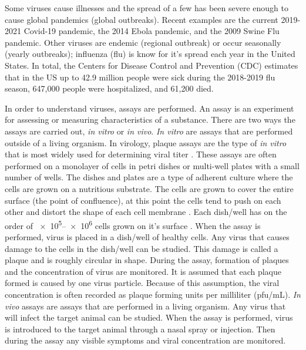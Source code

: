Some viruses cause illnesses and the spread of a few has been severe enough to cause global pandemics (global outbreaks). Recent examples are the current 2019-2021 Covid-19 pandemic, the 2014 Ebola pandemic, and the 2009 Swine Flu pandemic. Other viruses are endemic (regional outbreak) or occur seasonally (yearly outbreaks); influenza (flu) is know for it's spread each year in the United States. In total, the Centers for Disease Control and Prevention (CDC) estimates that in the US up to 42.9 million people were sick during the 2018-2019 flu season, 647,000 people were hospitalized, and 61,200 died. \citep{xu_update_2019}

In order to understand viruses, assays are performed. An assay is an experiment for assessing or measuring characteristics of a substance. There are two ways the assays are carried out, \emph{in vitro} or \emph{in vivo}. \emph{In vitro} are assays that are performed outside of a living organism. In virology, plaque assays are the type of  \emph{in vitro} that is most widely used for determining viral titer \citep{Kumar}.  These assays are often performed on a monolayer of cells in petri dishes or multi-well plates with a small number of wells. The dishes and plates are a type of adherent culture where the cells are grown on a nutritious substrate. The cells are grown to cover the entire surface (the point of confluence), at this point the cells tend to push on each other and distort the shape of each cell membrane \citep{bruckner_importance_2018}. Each dish/well has on the order of \numrange[range-phrase = --]{e5}{e6} cells grown on it's surface \citep{Number_of_cells_in_a_dish_noauthor_useful_nodate}. When the assay is performed, virus is placed in a dish/well of healthy cells. Any virus that causes damage to the cells in the dish/well can be studied. This damage is called a plaque and is roughly circular in shape. During the assay, formation of plaques and the concentration of virus are monitored. It is assumed that each plaque formed is caused by one virus particle. Because of this assumption, the viral concentration is often recorded as plaque forming units per milliliter (pfu/mL). \emph{In vivo} assays are assays that are performed in a living organism. Any virus that will infect the target animal can be studied. When the assay is performed, virus is introduced to the target animal through a nasal spray or injection. Then during the assay any visible symptoms and viral concentration are monitored.%

